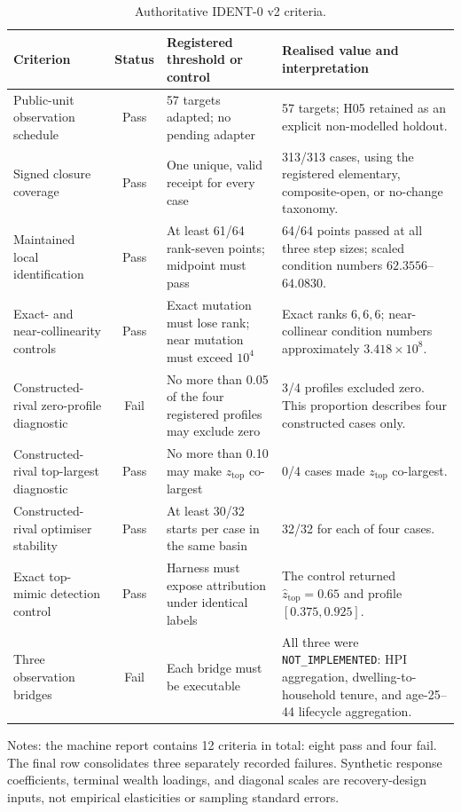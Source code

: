 \begin{table}[t]
  \centering
  \caption{Authoritative IDENT-0 v2 criteria.}
  \label{tab:ident0-criteria}
  \small
  \begin{tabular}{@{}p{}cp{}p{}@{}}
    \toprule
    Criterion & Status & Registered threshold or control & Realised value and interpretation \\
    \midrule
    Public-unit observation schedule
      & Pass & 57 targets adapted; no pending adapter
      & 57 targets; H05 retained as an explicit non-modelled holdout. \\
    Signed closure coverage
      & Pass & One unique, valid receipt for every case
      & 313/313 cases, using the registered elementary, composite-open, or no-change taxonomy. \\
    Maintained local identification
      & Pass & At least 61/64 rank-seven points; midpoint must pass
      & 64/64 points passed at all three step sizes; scaled condition numbers $62.3556$--$64.0830$. \\
    Exact- and near-collinearity controls
      & Pass & Exact mutation must lose rank; near mutation must exceed $10^{4}$
      & Exact ranks $6,6,6$; near-collinear condition numbers approximately $3.418\times10^{8}$. \\
    Constructed-rival zero-profile diagnostic
      & Fail & No more than 0.05 of the four registered profiles may exclude zero
      & 3/4 profiles excluded zero.  This proportion describes four constructed cases only. \\
    Constructed-rival top-largest diagnostic
      & Pass & No more than 0.10 may make $z_{\mathrm{top}}$ co-largest
      & 0/4 cases made $z_{\mathrm{top}}$ co-largest. \\
    Constructed-rival optimiser stability
      & Pass & At least 30/32 starts per case in the same basin
      & 32/32 for each of four cases. \\
    Exact top-mimic detection control
      & Pass & Harness must expose attribution under identical labels
      & The control returned $\widehat z_{\mathrm{top}}=0.65$ and profile $[0.375,0.925]$. \\
    Three observation bridges
      & Fail & Each bridge must be executable
      & All three were \texttt{NOT\_IMPLEMENTED}: HPI aggregation, dwelling-to-household tenure, and age-25--44 lifecycle aggregation. \\
    \bottomrule
  \end{tabular}
  \parbox{0.96\textwidth}{\footnotesize
    Notes: the machine report contains 12 criteria in total: eight pass and
    four fail.  The final row consolidates three separately recorded failures.
    Synthetic response coefficients, terminal wealth loadings, and diagonal
    scales are recovery-design inputs, not empirical elasticities or sampling
    standard errors.}
\end{table}

